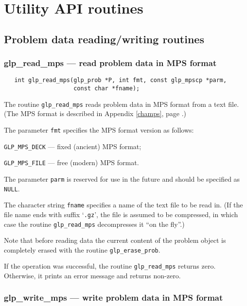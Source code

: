
\chapter{Utility API routines}

\section{Problem data reading/writing routines}

\subsection{glp\_read\_mps --- read problem data in MPS format}

\synopsis

\begin{verbatim}
   int glp_read_mps(glp_prob *P, int fmt, const glp_mpscp *parm,
                    const char *fname);
\end{verbatim}

\description

The routine \verb|glp_read_mps| reads problem data in MPS format from a
text file. (The MPS format is described in Appendix \ref{champs}, page
\pageref{champs}.)

The parameter \verb|fmt| specifies the MPS format version as follows:

\verb|GLP_MPS_DECK| --- fixed (ancient) MPS format;

\verb|GLP_MPS_FILE| --- free (modern) MPS format.

The parameter \verb|parm| is reserved for use in the future and should
be specified as \verb|NULL|.

The character string \verb|fname| specifies a name of the text file to
be read in. (If the file name ends with suffix `\verb|.gz|', the file
is assumed to be compressed, in which case the routine
\verb|glp_read_mps| decompresses it ``on the fly''.)

Note that before reading data the current content of the problem object
is completely erased with the routine \verb|glp_erase_prob|.

\returns

If the operation was successful, the routine \verb|glp_read_mps|
returns zero. Otherwise, it prints an error message and returns
non-zero.

\newpage

\subsection{glp\_write\_mps --- write problem data in MPS format}

